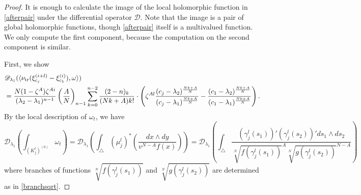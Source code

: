 \documentclass[letterpaper, 11pt]{amsart}
\theoremstyle{my theoremstyle}
\theoremstyle{dfn}
\theoremstyle{remark}
\renewcommand{\1}{\mathbbm{1}}
\renewcommand{\l}{\lambda}
\numberwithin{equation}{section}
\begin{document}
\begin{proof}
It is enough to calculate the image of the local holomorphic function in \eqref{afterpair} under the differential operator $\mathscr{D}$.
Note that the image is a pair of global holomorphic functions, though \eqref{afterpair} itself is a multivalued function.
We only compute the first component, because the computation on the second component is similar.

First, we show 
\begin{align} \label{eq11}
\begin{split}
&\mathscr{D}_{\l_1}(\langle \nu_{\rm tr}(\xi_{c_j}^{(i+l)} - \xi_{c_1}^{(i)}), \omega \rangle) \\
&=
\frac{N(1-\zeta^A)\zeta^{Ai}}{(\l_2-\l_1)^{n-1}} \left(\dfrac{A}N\right)_{n-1}
\displaystyle  \sum_{k=0}^{n-2}  \dfrac{(2-n)_k}{(Nk+A)k!} \cdot  
\left(
\zeta^{Al} \frac{(c_j-\l_2)^{\frac{Nk+A}{N}}}{(c_j-\l_1)^{\frac{Nk+A}{N}}}- \frac{(c_1-\l_2)^{\frac{Nk+A}{N}}}{(c_1-\l_1)^{\frac{Nk+A}{N}}}
\right). 
\end{split}
\end{align}
By the local description of $\omega_t$, we have
\begin{equation*}
\mathscr{D}_{\l_1} \left(\int_{(K_j^l)^{(0)}} \omega_t\right) = 
\mathscr{D}_{\l_1}\left(\int_{\triangle}(\mu_j^l)^*\left(\dfrac{dx\wedge dy}{v^{N-A}f(x)}\right)\right)
=\mathscr{D}_{\l_1} \left(\int_{\triangle} \dfrac{(\gamma_j^l(s_1))'(\gamma_j^l(s_2))'ds_1\wedge ds_2}{\sqrt[N]{f(\gamma_j^l(s_1))}^A \sqrt[N]{g(\gamma_j^l(s_2))}^{N-A}}\right)
\end{equation*}
where branches of functions $\sqrt[N]{f(\gamma_j^l(s_1))}$ and $\sqrt[N]{g(\gamma_j^l(s_2))}$ are determined as in \eqref{branchsqrt}.


\end{proof}
\end{document}
